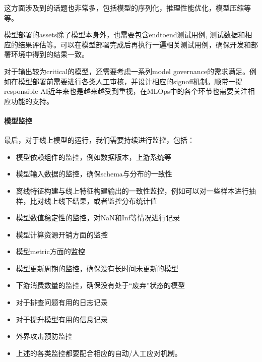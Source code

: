 \documentclass[letterpaper,11pt,english]{sphinxmanual}
\begin{document}
这方面涉及到的话题也非常多，包括模型的序列化，推理性能优化，模型压缩等等。

模型部署的assets除了模型本身外，也需要包含end\sphinxhyphen{}to\sphinxhyphen{}end测试用例,
测试数据和相应的结果评估等。可以在模型部署完成后再执行一遍相关测试用例，确保开发和部署环境中得到的结果一致。

对于输出较为critical的模型，还需要考虑一系列model
governance的需求满足。例如在模型部署前需要进行各类人工审核，并设计相应的sign\sphinxhyphen{}off机制。顺带一提responsible
AI近年来也是越来越受到重视，在MLOps中的各个环节也需要关注相应功能的支持。


\paragraph{模型监控}
\label{\detokenize{chapter_AI_dive/MLOps:id4}}
最后，对于线上模型的运行，我们需要持续进行监控，包括：
\begin{itemize}
\item {} 
模型依赖组件的监控，例如数据版本，上游系统等

\item {} 
模型输入数据的监控，确保schema与分布的一致性

\item {} 
离线特征构建与线上特征构建输出的一致性监控，例如可以对一些样本进行抽样，比对线上线下结果，或者监控分布统计值

\item {} 
模型数值稳定性的监控，对NaN和Inf等情况进行记录

\item {} 
模型计算资源开销方面的监控

\item {} 
模型metric方面的监控

\item {} 
模型更新周期的监控，确保没有长时间未更新的模型

\item {} 
下游消费数量的监控，确保没有处于“废弃”状态的模型

\item {} 
对于排查问题有用的日志记录

\item {} 
对于提升模型有用的信息记录

\item {} 
外界攻击预防监控

\item {} 
上述的各类监控都要配合相应的自动/人工应对机制。

\end{itemize}
\end{document}
